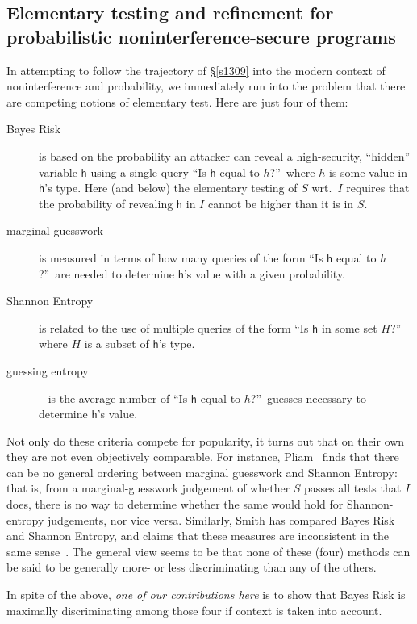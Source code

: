 \documentclass[runningheads]{llncs}
\newcommand\Vh {\mathsf{h}}
\newcommand\Sec[1] {Sec.~\ref{#1}}
\renewcommand\Sec[1] {\S\ref{#1}}
\begin{document}
\subsection{Elementary testing and refinement for probabilistic noninterference-secure programs}\label{s1028}
In attempting to follow the trajectory of \Sec{s1309} into the modern context of noninterference and probability, we immediately run into the problem that there are competing notions of elementary test. Here are just four of them:
\begin{description}
\item[Bayes Risk] \cite{Smith:07,Chatzikokolakis:07b,Braun:08,Braun:09} is based on the probability an attacker can reveal a high-security, ``hidden'' variable $\Vh$ using a single query ``Is $\Vh$ equal to $h$?''\ where $h$ is some value in $\Vh$'s type. Here (and below) the elementary testing of $S$ wrt.\ $I$ requires that the probability of revealing $\Vh$ in $I$ cannot be higher than it is in $S$.
\item[marginal guesswork] \cite{Pliam:00,Kopf:07} is measured in terms of how many queries of the form ``Is $\Vh$ equal to $h$?''\ are needed to determine $\Vh$'s value with a given probability.
\item[Shannon Entropy] \cite{Shannon:48} is related to the use of multiple queries of the form ``Is $\Vh$ in some set $H$?'' where $H$ is a subset of $\Vh$'s type.
\item[guessing entropy]~\cite{Massey:94,Kopf:07} is the average number of ``Is $\Vh$ equal to $h$?''\ guesses necessary to determine $\Vh$'s value.
\end{description}
Not only do these criteria compete for popularity, it turns out that on their own they are not even objectively comparable. For instance,  Pliam~\cite{Pliam:00} finds that there can be no general ordering between marginal guesswork and Shannon Entropy: that is, from a marginal-guesswork judgement of whether $S$ passes all tests that $I$ does, there is no way to determine whether the same would hold for Shannon-entropy judgements, nor vice versa.
Similarly, Smith has compared Bayes Risk and Shannon Entropy, and claims that these measures are inconsistent in the same sense~\cite{Smith:07}. The general view seems to be that none of these (four) methods can be said to be generally more- or less discriminating than any of the others.

In spite of the above, \emph{one of our contributions here} is to show that Bayes Risk is maximally discriminating among those four if context is taken into account.
\end{document}
